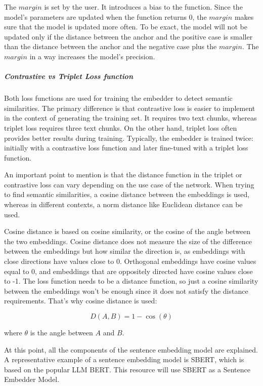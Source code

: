 \documentclass{wseas}
\begin{document}
The \(margin\) is set by the user. It introduces a bias to the function. Since the model's parameters 
are updated when the function returns 0, the \(margin\) makes sure that the model is updated more often. 
To be exact, the model will not be updated only if the distance between the anchor and the positive case is smaller
than the distance between the anchor and the negative case plus the \(margin\). The \(margin\) in a way
increases the model's precision.


\subparagraph{Contrastive vs Triplet Loss function}

Both loss functions are used for training the embedder to detect
semantic similarities. The primary difference is that contrastive loss
is easier to implement in the context of generating the training set. It
requires two text chunks, whereas triplet loss requires three text
chunks. On the other hand, triplet loss often provides better results
during training. Typically, the embedder is trained twice: initially
with a contrastive loss function and later fine-tuned with a triplet
loss function.

An important point to mention is that the distance function in the
triplet or contrastive loss can vary depending on the use case of the
network. When trying to find semantic similarities, a cosine distance
between the embeddings is used, whereas in different contexts, a norm
distance like Euclidean distance can be used.

Cosine distance is based on cosine similarity, or the cosine of the
angle between the two embeddings. Cosine distance does not measure the
size of the difference between the embeddings but how similar the
direction is, as embeddings with close directions have values close to
0. Orthogonal embeddings have cosine values equal to 0, and embeddings
that are oppositely directed have cosine values close to -1. The loss
function needs to be a distance function, so just a cosine similarity
between the embeddings won't be enough since it does not satisfy the
distance requirements. That's why cosine distance is used:

\begin{equation}
  D(A, B) = 1 - \cos(\theta)
\end{equation}

where \(\theta\) is the angle between \(A\) and \(B\).

At this point, all the components of the sentence embedding model are
explained. A representative example of a sentence embedding model is
SBERT, which is based on the popular LLM BERT. This resource will use
SBERT as a Sentence Embedder Model.
\end{document}
